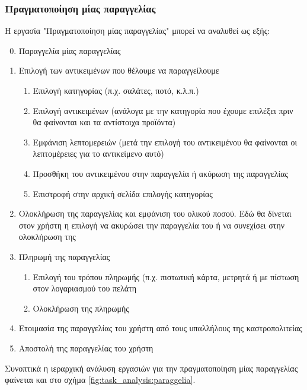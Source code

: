 \documentclass{assignment}
\begin{document}
\subsubsection{Πραγματοποίηση μίας παραγγελίας}

Η εργασία "Πραγματοποίηση μίας παραγγελίας" μπορεί να αναλυθεί ως εξής:

\begin{enumerate}
\setcounter{enumi}{-1}
\item Παραγγελία μίας παραγγελίας
\item Επιλογή των αντικειμένων που θέλουμε να παραγγείλουμε
  \begin{enumerate}[label*=\arabic*.]
  \item Επιλογή κατηγορίας (π.χ. σαλάτες, ποτό, κ.λ.π.)
  \item Επιλογή αντικειμένων (ανάλογα με την κατηγορία που έχουμε επιλέξει πριν θα φαίνονται και τα αντίστοιχα προϊόντα)
  \item Εμφάνιση λεπτομερειών (μετά την επιλογή του αντικειμένου θα φαίνονται οι λεπτομέρειες για το αντικείμενο αυτό)
  \item Προσθήκη του αντικειμένου στην παραγγελία ή ακύρωση της παραγγελίας
  \item Επιστροφή στην αρχική σελίδα επιλογής κατηγορίας
  \end{enumerate}
\item Ολοκλήρωση της παραγγελίας και εμφάνιση του ολικού ποσού. Εδώ θα δίνεται στον χρήστη η επιλογή να ακυρώσει την παραγγελία του ή να συνεχίσει στην ολοκλήρωση της
\item Πληρωμή της παραγγελίας
  \begin{enumerate}[label*=\arabic*.]
  \item Επιλογή του τρόπου πληρωμής (π.χ. πιστωτική κάρτα, μετρητά ή με πίστωση στον λογαριασμού του πελάτη
  \item Ολοκλήρωση της πληρωμής
  \end{enumerate}
\item Ετοιμασία της παραγγελίας του χρήστη από τους υπαλλήλους της καστροπολιτείας
\item Αποστολή της παραγγελίας του χρήστη
\end{enumerate}

Συνοπτικά η ιεραρχική ανάλυση εργασιών για την πραγματοποίηση μίας παραγγελίας φαίνεται και στο σχήμα \ref{fig:task_analysis:paraggelia}.
\end{document}

